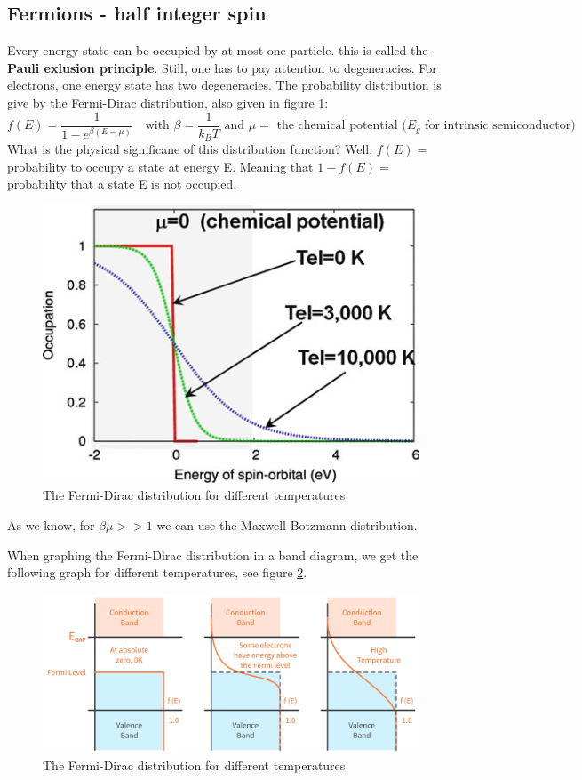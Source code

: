 \subsection{Fermions - half integer spin}
Every energy state can be occupied by at most one particle. this is called the \textbf{Pauli exlusion principle}. Still, one has to pay attention to degeneracies. For electrons, one energy state has two degeneracies. The probability distribution is give by the Fermi-Dirac distribution, also given in figure \ref{fig:fermidiracdistr}:
\begin{equation}
	f(E) = \frac{1}{1 - e^{\beta (E - \mu)}} \quad \text{with } \beta = \frac{1}{k_BT} \text{ and } \mu = \text{ the chemical potential ($E_g$ for intrinsic semiconductor)} \label{eqn:elec_fermi-dirac}
\end{equation}
What is the physical significane of this distribution function? Well, $f(E) = $ probability to occupy a state at energy E. Meaning that $1 - f(E) = $ probability that a state E is not occupied.
\begin{figure}[h]
	\centering
	\includegraphics[scale=0.5]{./fermi.png}
	\caption{The Fermi-Dirac distribution for different temperatures}
	\label{fig:fermidiracdistr}
\end{figure}
As we know, for $\beta\mu >> 1$ we can use the Maxwell-Botzmann distribution. \\ \par
When graphing the Fermi-Dirac distribution in a band diagram, we get the following graph for different temperatures, see figure \ref{fig:fermidiracinenergyband}.
\begin{figure}[h]
	\centering
	\includegraphics[scale=0.2]{./fermidirac_in_banddiagram.jpg}
	\caption{The Fermi-Dirac distribution for different temperatures}
	\label{fig:fermidiracinenergyband}
\end{figure}
